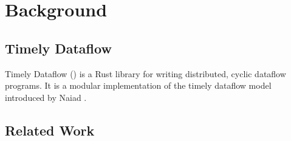 \chapter{Background}\label{ch:background}

\section{Timely Dataflow}

Timely Dataflow () is a Rust library for writing distributed,
cyclic dataflow programs. It is a modular implementation of the timely dataflow
model introduced by Naiad \cite{naiad}. 

\TODO{}

\section{Related Work}

\TODO{}
